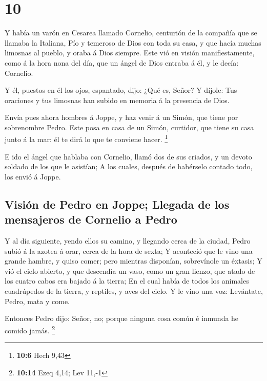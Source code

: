 \hypertarget{section-9}{%
\section{10}\label{section-9}}

 Y había un varón en Cesarea llamado Cornelio, centurión de
la compañía que se llamaba la Italiana,  Pío y temeroso de
Dios con toda su casa, y que hacía muchas limosnas al pueblo, y oraba á
Dios siempre.  Este vió en visión manifiestamente, como á la
hora nona del día, que un ángel de Dios entraba á él, y le decía:
Cornelio.

 Y él, puestos en él los ojos, espantado, dijo: ¿Qué es,
Señor? Y díjole: Tus oraciones y tus limosnas han subido en memoria á la
presencia de Dios.

 Envía pues ahora hombres á Joppe, y haz venir á un Simón,
que tiene por sobrenombre Pedro.  Este posa en casa de un
Simón, curtidor, que tiene su casa junto á la mar: él te dirá lo que te
conviene hacer. \footnote{\textbf{10:6} Hech 9,43}

 E ido el ángel que hablaba con Cornelio, llamó dos de sus
criados, y un devoto soldado de los que le asistían;  A los
cuales, después de habérselo contado todo, los envió á Joppe.

\hypertarget{visiuxf3n-de-pedro-en-joppe-llegada-de-los-mensajeros-de-cornelio-a-pedro}{%
\subsection{Visión de Pedro en Joppe; Llegada de los mensajeros de
Cornelio a
Pedro}\label{visiuxf3n-de-pedro-en-joppe-llegada-de-los-mensajeros-de-cornelio-a-pedro}}

 Y al día siguiente, yendo ellos su camino, y llegando cerca
de la ciudad, Pedro subió á la azotea á orar, cerca de la hora de sexta;
 Y aconteció que le vino una grande hambre, y quiso comer;
pero mientras disponían, sobrevínole un éxtasis;  Y vió el
cielo abierto, y que descendía un vaso, como un gran lienzo, que atado
de los cuatro cabos era bajado á la tierra;  En el cual
había de todos los animales cuadrúpedos de la tierra, y reptiles, y aves
del cielo.  Y le vino una voz: Levántate, Pedro, mata y
come.

 Entonces Pedro dijo: Señor, no; porque ninguna cosa común
é inmunda he comido jamás. \footnote{\textbf{10:14} Ezeq 4,14; Lev 11,-1}

